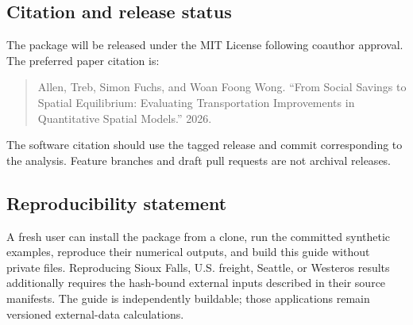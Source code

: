\subsection{Citation and release status}

The package will be released under the MIT License following coauthor approval.
The preferred paper citation is:

\begin{quote}
Allen, Treb, Simon Fuchs, and Woan Foong Wong. ``From Social Savings to
Spatial Equilibrium: Evaluating Transportation Improvements in Quantitative
Spatial Models.'' 2026.
\end{quote}

The software citation should use the tagged release and commit corresponding
to the analysis. Feature branches and draft pull requests are not archival
releases.

\subsection{Reproducibility statement}

A fresh user can install the package from a clone, run the committed synthetic
examples, reproduce their numerical outputs, and build this guide without
private files. Reproducing Sioux Falls, U.S. freight, Seattle, or Westeros
results additionally requires the hash-bound external inputs described in
their source manifests. The guide is independently buildable; those
applications remain versioned external-data calculations.
